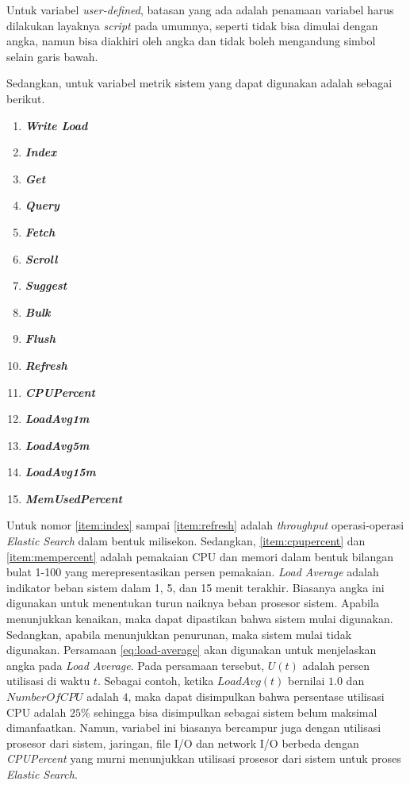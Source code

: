 \begin{enumerate}
        Untuk variabel \textit{user-defined}, batasan yang ada adalah penamaan variabel harus dilakukan layaknya \textit{script} pada umumnya, seperti tidak bisa dimulai dengan angka, namun bisa diakhiri oleh angka dan tidak boleh mengandung simbol selain garis bawah.

        Sedangkan, untuk variabel metrik sistem yang dapat digunakan adalah sebagai berikut.

        \begin{enumerate}
            \item \textbf{\textit{Write Load}}
            \item \textbf{\textit{Index}}\label{item:index}
            \item \textbf{\textit{Get}}
            \item \textbf{\textit{Query}}
            \item \textbf{\textit{Fetch}}
            \item \textbf{\textit{Scroll}}
            \item \textbf{\textit{Suggest}}
            \item \textbf{\textit{Bulk}}
            \item \textbf{\textit{Flush}}
            \item \textbf{\textit{Refresh}}\label{item:refresh}
            \item \textbf{\textit{CPUPercent}}\label{item:cpupercent}
            \item \textbf{\textit{LoadAvg1m}}\label{item:load-avg-1}
            \item \textbf{\textit{LoadAvg5m}}
            \item \textbf{\textit{LoadAvg15m}}\label{item:load-avg-15}
            \item \textbf{\textit{MemUsedPercent}}\label{item:mempercent}
        \end{enumerate}

        Untuk nomor \ref{item:index} sampai \ref{item:refresh} adalah \textit{throughput} operasi-operasi \textit{Elastic Search} dalam bentuk milisekon. Sedangkan, \ref{item:cpupercent} dan \ref{item:mempercent} adalah pemakaian CPU dan memori dalam bentuk bilangan bulat 1-100 yang merepresentasikan persen pemakaian. \textit{Load Average} adalah indikator beban sistem dalam 1, 5, dan 15 menit terakhir. Biasanya angka ini digunakan untuk menentukan turun naiknya beban prosesor sistem. Apabila menunjukkan kenaikan, maka dapat dipastikan bahwa sistem mulai digunakan. Sedangkan, apabila menunjukkan penurunan, maka sistem mulai tidak digunakan. Persamaan \ref{eq:load-average} akan digunakan untuk menjelaskan angka pada \textit{Load Average}. Pada persamaan tersebut, $U(t)$ adalah persen utilisasi di waktu $t$. Sebagai contoh, ketika $LoadAvg(t)$ bernilai $1.0$ dan $NumberOfCPU$ adalah $4$, maka dapat disimpulkan bahwa persentase utilisasi CPU adalah $25\%$ sehingga bisa disimpulkan sebagai sistem belum maksimal dimanfaatkan. Namun, variabel ini biasanya bercampur juga dengan utilisasi prosesor dari sistem, jaringan, file I/O dan network I/O berbeda dengan \textit{CPUPercent} yang murni menunjukkan utilisasi prosesor dari sistem untuk proses \textit{Elastic Search}.


\end{enumerate}
